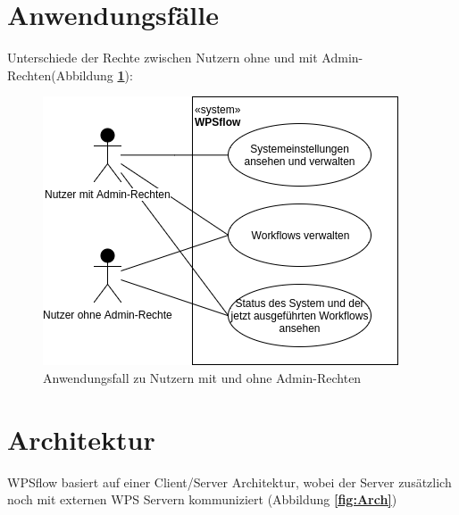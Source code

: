     \section{Anwendungsfälle}
    
    Unterschiede der Rechte zwischen Nutzern ohne und mit Admin-Rechten(Abbildung \textbf{\ref{fig:AWF}}):
    
    \begin{figure}[h]
        \centering
        \includegraphics[width=\textwidth]{images/Anwendungsfall1.png}
        \caption{Anwendungsfall zu Nutzern mit und ohne Admin-Rechten}
        \label{fig:AWF}
    \end{figure}
    

    
    
    
    \newpage
    \section{Architektur}

    WPSflow basiert auf einer Client/Server Architektur, wobei der Server zusätzlich noch mit externen WPS Servern kommuniziert (Abbildung \textbf{\ref{fig:Arch}})\newline
    
